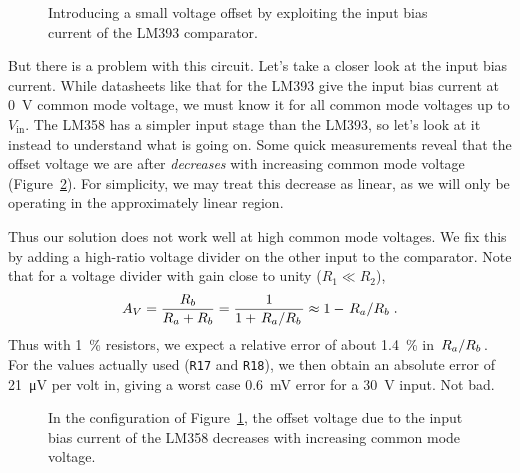 \documentclass[letterpaper,twocolumn,11pt]{article}
\newcommand{\refdes}[1]{\texttt{#1}}
\begin{document}
\begin{figure}
  \centering
  \caption{Introducing a small voltage offset by exploiting the input bias
  current of the LM393 comparator.}
  \label{fig:biasoff}
\end{figure}

But there is a problem with this circuit. Let's take a closer look at the input
bias current. While datasheets like that for the LM393 give the input bias
current at \SI{0}{\V} common mode voltage, we must know it for all common mode
voltages up to $V_$. The LM358 has a simpler input stage than the
LM393, so let's look at it instead to understand what is going on. Some quick
measurements reveal that the offset voltage we are after \emph{decreases} with
increasing common mode voltage (Figure~\ref{fig:lm358}). For simplicity, we may
treat this decrease as linear, as we will only be operating in the approximately
linear region.

Thus our solution does not work well at high common mode voltages. We fix this
by adding a high-ratio voltage divider on the other input to the comparator.
Note that for a voltage divider with gain close to unity ($R_1 \ll R_2$),
\[
  A_V
  = \frac{R_b}{R_a + R_b}
  = \frac{1}{1 + \flatfrac{R_a}{R_b}}
  \approx 1 - \flatfrac{R_a}{R_b}.
\]
Thus with \SI{1}{\percent} resistors, we expect a relative error of about
\SI{1.4}{\percent} in $$. For the values actually used
(\refdes{R17} and \refdes{R18}), we then obtain an absolute error of
\SI{21}{\uV} per volt in, giving a worst case \SI{0.6}{\mV} error for a
\SI{30}{\V} input. Not bad.

\begin{figure}
  \centering
  
  \caption{In the configuration of Figure~\ref{fig:biasoff}, the offset voltage
    due to the input bias current of the LM358 decreases with increasing common
  mode voltage.}
  \label{fig:lm358}
\end{figure}
\end{document}
